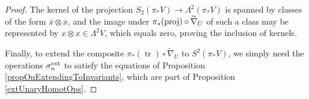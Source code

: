 \documentclass[11pt]{amsart} \renewcommand{\baselinestretch}{1.2}
\theoremstyle{plain}
\numberwithin{equation}{section} %
\theoremstyle{plain}
\numberwithin{equation}{chapter} %
\DeclareMathOperator{\trace}{tr}
\newcommand{\DASH}{\mathrm{-}}
\renewcommand{\to}{\longrightarrow}
\newcommand{\calV}{\mathcal{V}}
\newcommand{\restn}[1]{#1^{[2]}}
\newcommand{\vect}[2]{\calV^{#1}_{#2}}
\newcommand{\Nabla}{\nabla}
\renewcommand{\mapsto}{\longmapsto}
\begin{document}
\begin{Constructing homotopy operations}
\begin{proof}
The kernel of the projection $S_2(\pi_*V)\to \Lambda^2(\pi_*V)$ is spanned by classes of the form $\overline{x}\otimes \overline{x}$, and the image under $\pi_*(\textup{proj})\circ\widetilde{\nabla}_U$ of such a class may be represented by $x\otimes x\in \Lambda^2V$, which equals zero, proving the inclusion of kernels.

Finally, to extend the composite $\pi_*(\trace)\circ\widetilde{\nabla}_U$ to $S^2(\pi_*V)$, we simply need the operations $\sigma_n^\textup{ext}$ to satisfy the equations of Proposition \ref{propOnExtendingToInvariants}, which are part of Proposition \ref{extUnaryHomotOps}.
%
%
%
%
%
\end{proof}


\end{Constructing homotopy operations}
\end{document}
